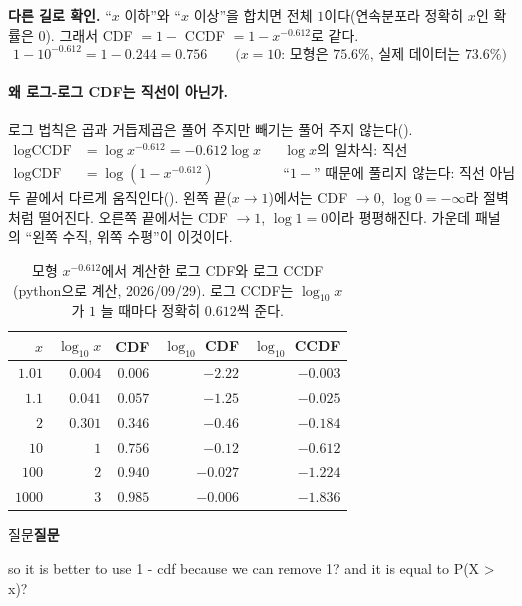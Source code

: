 \documentclass[11pt]{article}
\newenvironment{callout}[1][]
  {\par\medskip\noindent
   \begin{lrbox}{\calloutbox}\begin{minipage}{0.92\linewidth}
   \def\calloutttl{#1}\ifx\calloutttl\empty\else\textbf{#1}\par\smallskip\fi}
  {\end{minipage}\end{lrbox}%
   \fcolorbox{black!30}{black!3}{\usebox{\calloutbox}}\par\medskip}
\newcommand{\term}[1]{\textbf{#1}}
\begin{document}
\term{다른 길로 확인.} ``$x$ 이하''와 ``$x$ 이상''을 합치면 전체 $1$이다(연속분포라
정확히 $x$인 확률은 $0$). 그래서 CDF $= 1 -$ CCDF $= 1 - x^{-0.612}$로 같다.
\[
  1 - 10^{-0.612} = 1 - 0.244 = 0.756
  \qquad \text{($x = 10$: 모형은 $75.6\%$, 실제 데이터는 $73.6\%$)}
\]

\paragraph{왜 로그-로그 CDF는 직선이 아닌가.} 로그 법칙은 곱과 거듭제곱은 풀어 주지만
빼기는 풀어 주지 않는다().
\begin{align*}
  \log \text{CCDF} &= \log x^{-0.612} = -0.612 \log x
    && \text{$\log x$의 일차식: 직선}\\
  \log \text{CDF} &= \log\left(1 - x^{-0.612}\right)
    && \text{``$1 -$'' 때문에 풀리지 않는다: 직선 아님}
\end{align*}
두 끝에서 다르게 움직인다(). 왼쪽 끝($x \to 1$)에서는 CDF $\to 0$,
$\log 0 = -\infty$라 절벽처럼 떨어진다. 오른쪽 끝에서는 CDF $\to 1$, $\log 1 = 0$이라
평평해진다.  가운데 패널의 ``왼쪽 수직, 위쪽 수평''이 이것이다.

\begin{table}[H]
  \centering
  \caption{모형 $x^{-0.612}$에서 계산한 로그 CDF와 로그 CCDF (python으로 계산, 2026/09/29).
    로그 CCDF는 $\log_{10} x$가 $1$ 늘 때마다 정확히 $0.612$씩 준다.}
  \label{tab:log-cdf}
  \begin{tabular}{rrrrr}
    \toprule
    $x$ & $\log_{10} x$ & CDF & $\log_{10}$ CDF & $\log_{10}$ CCDF \\
    \midrule
    $1.01$ & $0.004$ & $0.006$ & $\mathbf{-2.22}$ & $-0.003$ \\
    \midrule
    $1.1$  & $0.041$ & $0.057$ & $\mathbf{-1.25}$ & $-0.025$ \\
    \midrule
    $2$    & $0.301$ & $0.346$ & $-0.46$ & $-0.184$ \\
    \midrule
    $10$   & $1$     & $0.756$ & $-0.12$ & $-0.612$ \\
    \midrule
    $100$  & $2$     & $0.940$ & $-0.027$ & $-1.224$ \\
    \midrule
    $1000$ & $3$     & $0.985$ & $\mathbf{-0.006}$ & $-1.836$ \\
    \bottomrule
  \end{tabular}
\end{table}

\begin{callout}[질문]
so it is better to use 1 - cdf because we can remove 1? and it is equal to P(X > x)?
\end{callout}
\end{document}
